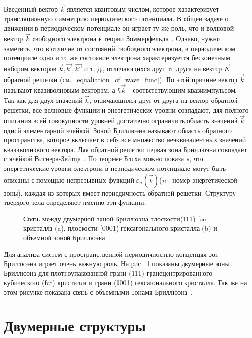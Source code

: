 Введенный вектор $\vec{k}$ является квантовым числом, которое 
характеризует трансляционную симметрию периодического потенциала. 
В общей задаче о движении в периодическом потенциале он играет ту же роль, что и волновой вектор $\vec{k}$ свободного электрона в теории 
Зоммерфельда~\cite{Kittel1976}. Однако, нужно заметить, что в отличие 
от состояний свободного электрона, в периодическом потенциале одно
и то же состояние электрона характеризуется бесконечным набором векторов
$\vec{k}, \vec{k'}, \vec{k''}$ и т. д., отличающихся друг от друга на вектор $\vec{K}$ обратной решетки (см.~\ref{equaliation_of_wave_func}).
По этой причине вектор $\vec{k}$ называют квазиволновым вектором, а
$\hbar\vec{k}$ - соответствующим квазиимпульсом. Так как для двух
значений $\vec{k}$, отличающихся друг от друга на вектор обратной 
решетки, все волновые функции и энергетические уровни совпадают,
для полного описания всей совокупности уровней достаточно ограничить
область значений $\vec{k}$ одной элементарной ячейкой.
Зоной Бриллюэна называют область обратного пространства, которое включает
в себя все множество неэквивалентных значений квазиволнового вектора.
Для обратной решетки первая зона Бриллюэна совпадает с ячейкой 
Вигнера-Зейтца~\cite{Kittel1976}. По теореме Блоха можно показать, что 
энергетические уровни электрона в периодическом потенциале могут быть описаны с помощью непрерывных функций $\varepsilon_n(\vec{k})$(\textit{n} - 
номер энергетической зоны), каждая из которых имеет периодичность
обратной решетки. Структуру твердого тела определяют именно эти 
функции\cite{Simonov_disser}.
\begin{figure}[!ht]
\caption{Связь между двумерной зоной Бриллюэна плоскости(111) fcc
кристалла (a), плоскости (0001) гексагонального кристалла (b) и 
объемной зоной Бриллюэна~\cite{Hufner2019}}
\label{pic:Brilluen_zones}
\end{figure}


Для анализа систем с пространственной периодичностью концепция
зон Бриллюэна играет очень важную роль. На рис.~\ref{pic:Brilluen_zones}
показаны двумерные зоны Бриллюэна для плотноупакованной грани (111) 
гранецентрированного кубического (fcc) кристалла и грани (0001)
гексагонального кристалла. Так же на этом рисунке показана связь с 
объемными Зонами Бриллюэна~\cite{Hufner2019}. 




\section{Двумерные структуры} \label{sect1_1}